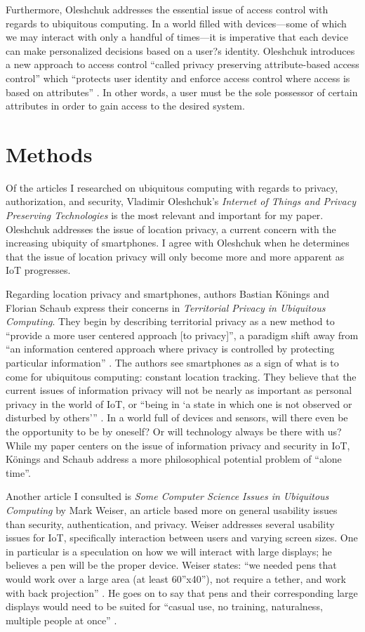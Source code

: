 \documentclass[11pt, oneside]{article}   	%
\begin{document}
Furthermore, Oleshchuk addresses the essential issue of access control with regards to ubiquitous computing. In a world filled with devices---some of which we may interact with only a handful of times---it is imperative that each device can make personalized decisions based on a user?s identity. Oleshchuk introduces a new approach to access control ``called privacy preserving attribute-based access control'' which ``protects user identity and enforce access control where access is based on attributes'' \cite{oleshchuk}. In other words, a user must be the sole possessor of certain attributes in order to gain access to the desired system.

\section{Methods}
Of the articles I researched on ubiquitous computing with regards to privacy, authorization, and security, Vladimir Oleshchuk's \textit{Internet of Things and Privacy Preserving Technologies} is the most relevant and important for my paper. Oleshchuk addresses the issue of location privacy, a current concern with the increasing ubiquity of smartphones. I agree with Oleshchuk when he determines that the issue of location privacy will only become more and more apparent as IoT progresses.

Regarding location privacy and smartphones, authors Bastian K{\"o}nings and Florian Schaub express their concerns in \textit{Territorial Privacy in Ubiquitous Computing}. They begin by describing territorial privacy as a new method to ``provide a more user centered approach [to privacy]'', a paradigm shift away from ``an information centered approach where privacy is controlled by protecting particular information'' \cite{koningsandschaub}. The authors see smartphones as a sign of what is to come for ubiquitous computing: constant location tracking. They believe that the current issues of information privacy will not be nearly as important as personal privacy in the world of IoT, or ``being in `a state in which one is not observed or disturbed by others''' \cite{koningsandschaub}. In a world full of devices and sensors, will there even be the opportunity to be by oneself? Or will technology always be there with us? While my paper centers on the issue of information privacy and security in IoT, K{\"o}nings and Schaub address a more philosophical potential problem of ``alone time''.

Another article I consulted is \textit{Some Computer Science Issues in Ubiquitous Computing} by Mark Weiser, an article based more on general usability issues than security, authentication, and privacy. Weiser addresses several usability issues for IoT, specifically interaction between users and varying screen sizes. One in particular is a speculation on how we will interact with large displays; he believes a pen will be the proper device. Weiser states: ``we needed pens that would work over a large area (at least 60''x40''), not require a tether, and work with back projection'' \cite{weiser}. He goes on to say that pens and their corresponding large displays would need to be suited for ``casual use, no training, naturalness, multiple people at once'' \cite{weiser}.
\end{document}
